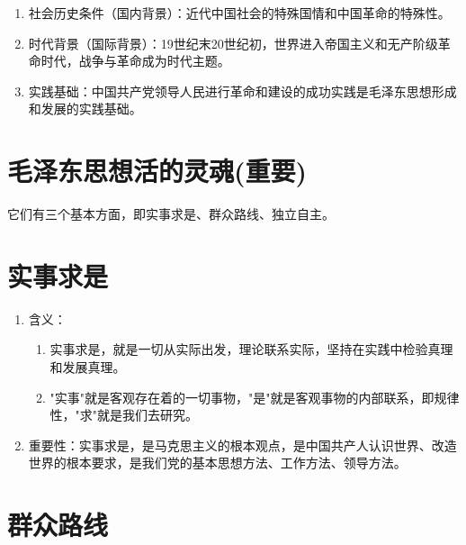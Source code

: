 \documentclass[12pt, a4paper, oneside]{ctexbook}
\begin{document}
\begin{enumerate}[label=（\arabic*）]
\item 社会历史条件（国内背景）：近代中国社会的特殊国情和中国革命的特殊性。

\item 时代背景（国际背景）：19世纪末20世纪初，世界进入帝国主义和无产阶级革命时代，战争与革命成为时代主题。

\item 实践基础：中国共产党领导人民进行革命和建设的成功实践是毛泽东思想形成和发展的实践基础。
\end{enumerate}

\section{毛泽东思想活的灵魂(重要)}
它们有三个基本方面，即实事求是、群众路线、独立自主。

\section{实事求是}

\begin{enumerate}[label=（\arabic*）]
\item 含义：
\begin{enumerate}[label=（\roman*）]
\item 实事求是，就是一切从实际出发，理论联系实际，坚持在实践中检验真理和发展真理。

\item "实事"就是客观存在着的一切事物，"是"就是客观事物的内部联系，即规律性，"求"就是我们去研究。
\end{enumerate}

\item 重要性：实事求是，是马克思主义的根本观点，是中国共产人认识世界、改造世界的根本要求，是我们党的基本思想方法、工作方法、领导方法。
\end{enumerate}

\section{群众路线}
\end{document}
